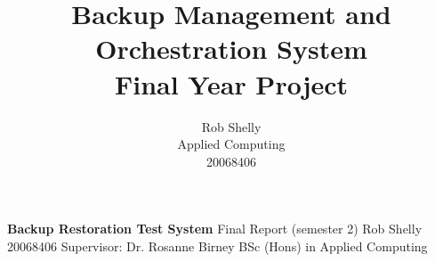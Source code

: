 \documentclass[]{article}
\title{Backup Management and Orchestration System\\
	Final Year Project}
\author{Rob Shelly\\
	Applied Computing\\
	20068406}
\begin{document}
\noindent \LARGE{\textbf{Backup Restoration Test System}}
\bigbreak
\noindent \large{Final Report (semester 2)}
\bigbreak
\noindent \Large{Rob Shelly}
\bigbreak
\noindent \Large{20068406}
\bigbreak
\noindent \Large{Supervisor: Dr. Rosanne Birney}
\bigbreak
\bigbreak
\noindent \Large{BSc (Hons) in Applied Computing}
\thispagestyle{empty}

\newpage
{}
\tableofcontents

\newpage
{}









\newpage
\renewcommand*{\bibfont}{\raggedright}



\begin{appendices}
  
  
\end{appendices}
\end{document}
